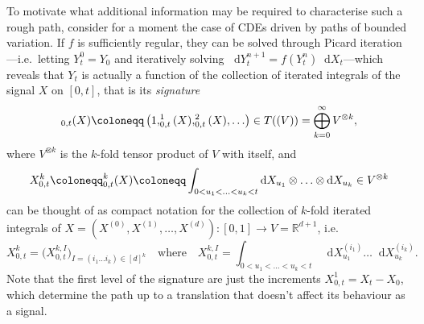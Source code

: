 \documentclass[11pt, letterpaper]{article}
\let\sig\relax
\DeclareMathOperator{\sig}{S}
\theoremstyle{definition}
\theoremstyle{remark}
\newcommand{\R}{\mathbb{R}}
\newcommand{\diff}{\mathop{}\!\mathrm{d}}
\begin{document}
\begin{appendices}
To motivate what additional information may be required to characterise such a rough path, consider for a moment the case of CDEs driven by paths of bounded variation. If $f$ is sufficiently regular, they can be solved through Picard iteration---i.e.\ letting $Y^0_t = Y_0$ and iteratively solving $\diff Y^{n+1}_t = f(Y^n_t) \diff X_t$---which reveals that $Y_t$ is actually a function of the collection of iterated integrals of the signal $X$ on $[0,t]$, that is its  \emph{signature} \[
    \sig_{0,t}(X) \coloneqq \left( 1,\sig^1_{0,t}(X), \sig^2_{0,t}(X),\ldots \right) \in T((V)) = \bigoplus_{k=0}^\infty V^{\otimes k},
\] where $V^{\otimes k}$ is the $k$-fold tensor product of $V$ with itself, and 
\begin{equation*}
    X^k_{0,t} \coloneqq \sig^k_{0,t}(X) \coloneqq \int_{0 < u_1 < \ldots< u_k < t} \diff X_{u_1} \otimes \ldots\otimes \diff X_{u_k} \in V^{\otimes  k}
\end{equation*}
can be thought of as compact notation for the collection of $k$-fold iterated integrals of $X = (X^{(0)}, X^{(1)}, \ldots ,X^{(d)})\colon [0,1] \to V = \R^{d+1}$, i.e.\ \[
    X^k_{0,t} = \big(X^{k,I}_{0,t}\big)_{I = (i_1 \ldots i_k) \in [d]^k}\quad \text{where} \quad X^{k,I}_{0,t} = \int_{0 < u_1 < \ldots< u_k < t} \diff X_{u_1}^{(i_1)} \ldots \diff X_{u_k}^{(i_k)}.
\]
Note that the first level of the signature are just the increments $X^1_{0,t} = X_t - X_0$, which determine the path up to a translation that doesn't affect its behaviour as a signal.


\end{appendices}
\end{document}
